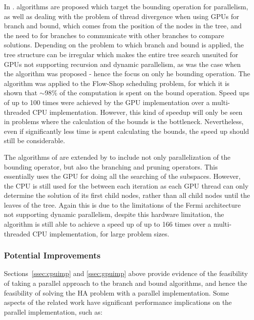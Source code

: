 \documentclass[10pt,twocolumn]{witseiepaper}
\begin{document}
In \cite{melab:2012, chakroun:2012}. algorithms are proposed which target the bounding operation for parallelism,
as well as dealing with the problem of thread divergence when using GPUs for branch and bound, which comes
from the position of the nodes in the tree, and the need to for branches to communicate with other branches to
compare solutions. Depending on the problem to which branch and bound is applied, the tree structure can be
irregular which makes the entire tree search unsuited for GPUs not supporting recursion and dynamic 
parallelism, as was the case when the algorithm was proposed - hence the focus on only he bounding 
operation. The algorithm was applied to the Flow-Shop scheduling problem, for which it is shown that
$\mathit{\sim}$98$\%$ of the computation is spent on the bound operation. Speed ups of up to
100 times were achieved by the GPU implementation over a multi-threaded CPU implementation. However, this 
kind of speedup will only be seen in problems where the calculation of the bounds is the bottleneck. 
Nevertheless, even if significantly less time is spent calculating the bounds, the speed up should still be
considerable.

The algorithms of \cite{melab:2012, chakroun:2012} are extended by \cite{chakroun:2013} to 
include not only parallelization of the bounding operator, but also the branching and pruning operators. This
essentially uses the GPU for doing all the searching of the subspaces. However, the CPU is still used for the
between each iteration as each GPU thread can only determine the solution of its first child nodes, rather 
than all child nodes until the leaves of the tree. Again this is due to the limitations of the Fermi 
architecture not supporting dynamic parallelism, despite this hardware limitation, the algorithm is still able
to achieve a speed up of up to 166 times over a multi-threaded CPU implementation, for large problem sizes.

\subsubsection{ Potential Improvements }

Sections~\ref{ssec:cpuimp} and \ref{ssec:gpuimp} above provide evidence of the feasibility of taking a
parallel approach to the branch and bound algorithms, and hence the feasibility of solving the HA problem with
a parallel implementation. Some aspects of the related work have significant performance implications on the
parallel implementation, such as:
\end{document}
